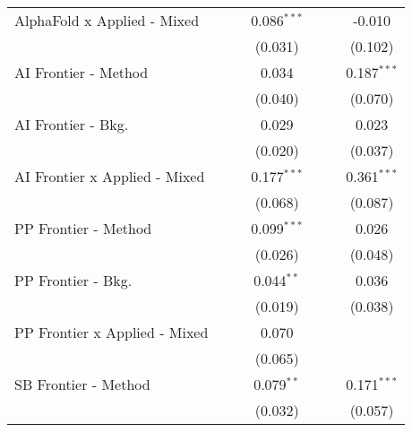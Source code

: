 \begin{tabular}{lcccccc}
   AlphaFold x Applied - Mixed   &               &               & 0.086$^{***}$ &               &               & -0.010\\   
                                 &               &               & (0.031)       &               &               & (0.102)\\   
   AI Frontier - Method          &               &               & 0.034         &               &               & 0.187$^{***}$\\   
                                 &               &               & (0.040)       &               &               & (0.070)\\   
   AI Frontier - Bkg.            &               &               & 0.029         &               &               & 0.023\\   
                                 &               &               & (0.020)       &               &               & (0.037)\\   
   AI Frontier x Applied - Mixed &               &               & 0.177$^{***}$ &               &               & 0.361$^{***}$\\   
                                 &               &               & (0.068)       &               &               & (0.087)\\   
   PP Frontier - Method          &               &               & 0.099$^{***}$ &               &               & 0.026\\   
                                 &               &               & (0.026)       &               &               & (0.048)\\   
   PP Frontier - Bkg.            &               &               & 0.044$^{**}$  &               &               & 0.036\\   
                                 &               &               & (0.019)       &               &               & (0.038)\\   
   PP Frontier x Applied - Mixed &               &               & 0.070         &               &               &   \\   
                                 &               &               & (0.065)       &               &               &   \\   
   SB Frontier - Method          &               &               & 0.079$^{**}$  &               &               & 0.171$^{***}$\\   
                                 &               &               & (0.032)       &               &               & (0.057)\\   

\end{tabular}
